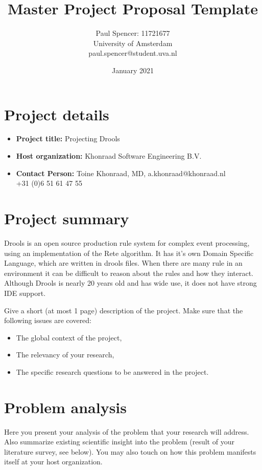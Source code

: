 \documentclass{article}
\title{Master Project Proposal Template}
\author{Paul Spencer: 11721677\\University of Amsterdam\\paul.spencer@student.uva.nl}
\date{January 2021}
\begin{document}
\maketitle

\section*{Project details}
\begin{itemize}
    \item \textbf{Project title:} Projecting Drools
    \item \textbf{Host organization:} Khonraad Software Engineering B.V.
    \item \textbf{Contact Person:} Toine Khonraad, MD, a.khonraad@khonraad.nl\\ +31 (0)6 51 61 47 55
\end{itemize}

\section{Project summary}
Drools is an open source production rule system for complex event processing, using an implementation of the Rete algorithm.
It has it's own Domain Specific Language, which are written in drools files.
When there are many rule in an environment it can be difficult to reason about the rules and how they interact.
Although Drools is nearly 20 years old and has wide use, it does not have strong IDE support.

Give a short (at most 1 page) description of the project. Make sure that the following issues are covered:
\begin{itemize}
    \item The global context of the project,
    \item The relevancy of your research,
    \item The specific research questions to be answered in the project.
\end{itemize}


\section{Problem analysis}

Here you present your analysis of the problem that your research will address. Also summarize existing scientific insight into the problem (result of your literature survey, see below). You may also touch on how this problem manifests itself at your host organization.
\end{document}
